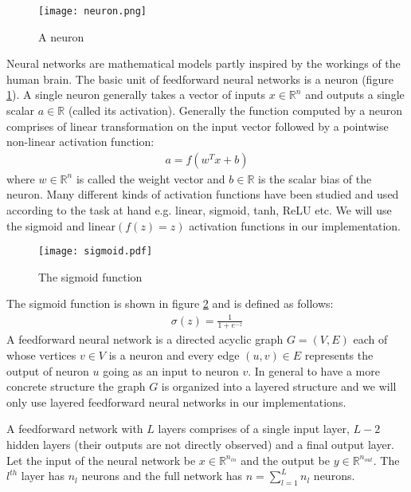 \begin{figure}[ht]
\begin{center}
\centerline{\texttt{[image: neuron.png]}}
\caption{A neuron}
\label{fig:neuron}
\end{center}
\vskip -0.4in
\end{figure}

Neural networks are mathematical models partly inspired by the workings of the human brain.
The basic unit of feedforward neural networks is a neuron (figure \ref{fig:neuron}).
A single neuron generally takes a vector of inputs $x \in \mathbb{R}^n$ and outputs a single scalar $a \in \mathbb{R}$ (called its activation).
Generally the function computed by a neuron comprises of linear transformation on the input vector followed by a pointwise non-linear activation function:
\begin{align}
a = f(w^T x + b)
\end{align}
where $w \in \mathbb{R}^n$ is called the weight vector and $b \in \mathbb{R}$ is the scalar bias of the neuron.
Many different kinds of activation functions have been studied and used according to the task at hand e.g. linear, sigmoid, tanh, ReLU etc. We will use the sigmoid and linear$(f(z) = z)$ activation functions in our implementation.

\begin{figure}[ht]
\begin{center}
\centerline{\texttt{[image: sigmoid.pdf]}}
\caption{The sigmoid function \cite{neuron}}
\label{fig:sigmoid}
\end{center}
\vskip -0.2in
\end{figure}

The sigmoid function is shown in figure \ref{fig:sigmoid} and is defined as follows:
\begin{align}
\sigma(z) = \frac{1}{1 + e^{-z}}
\end{align}
A feedforward neural network is a directed acyclic graph $G = (V,E)$ each of whose vertices $v \in V$ is a neuron and every edge $(u,v) \in E$ represents the output of neuron $u$ going as an input to neuron $v$. In general to have a more concrete structure the graph $G$ is organized into a layered structure and we will only use layered feedforward neural networks in our implementations. 

A feedforward network with $L$ layers comprises of a single input layer, $L-2$ hidden layers (their outputs are not directly observed) and a final output layer.
Let the input of the neural network be $x \in \mathbb{R}^{n_{in}}$ and the output be $y \in \mathbb{R}^{n_{out}}$.
The $l^{th}$ layer has $n_l$ neurons and the full network has $n = \sum_{l=1}^L n_l$ neurons. 

